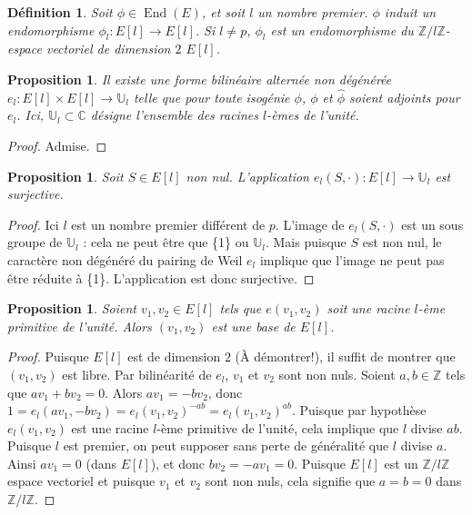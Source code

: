 \documentclass{article}
\theoremstyle{plain}%
\newtheorem{prop}[thm]{Proposition}
\newtheorem{deff}[thm]{Définition}
\theoremstyle{definition}%
\newcommand{\Z}{\mathbb{Z}}
\newcommand{\U}{\mathbb{U}}
\newcommand{\h}{\widehat}
\DeclareMathOperator{\End}{End}
\begin{document}
\begin{deff}
  Soit $\phi\in \End(E)$, et soit $l$ un nombre premier. $\phi$ induit un endomorphisme $\phi_l : E[l] \to E[l]$. Si $l\neq p$, $\phi_l$ est un endomorphisme du $\Z/l\Z$-espace vectoriel de dimension $2$ $E[l]$. 
\end{deff}

\begin{prop}
  \label{pairing}
  Il existe une forme bilinéaire alternée non dégénérée 
  $e_l : E[l] \times E[l] \to \mathbb{U}_l$ telle que pour toute isogénie $\phi$, $\phi$ et $\h\phi$ soient adjoints pour $e_l$.
  Ici, $\mathbb{U}_l \subset \mathbb{C}$ 
  désigne l'ensemble des racines $l$-èmes de l'unité.
\end{prop}

\begin{proof}
  Admise.
\end{proof}

\begin{prop}
  \label{surj_el}
  Soit $S\in E[l]$ non nul. L'application $e_l(S,\cdot):E[l] \to \mathbb{U}_l$ est surjective.
\end{prop}

\begin{proof}
  Ici $l$ est un nombre premier différent de $p$. L'image de  $e_l(S,\cdot)$ est un sous groupe de $\mathbb{U}_l$ : cela ne peut être que \{1\} ou $\U_l$. Mais puisque $S$ est non nul, le caractère non dégénéré du pairing de Weil $e_l$ implique que l'image ne peut pas être réduite à \{1\}. L'application est donc surjective.
\end{proof}

\begin{prop}
  \label{pairing_base}
  Soient $v_1, v_2\in E[l]$ tels que $e(v_1, v_2)$ soit une racine $l$-ème primitive de l'unité. Alors $(v_1, v_2)$ est une base de $E[l]$. 
\end{prop}

\begin{proof}
  Puisque $E[l]$ est de dimension $2$ {\color{red} (À démontrer!)}, il suffit de montrer que $(v_1, v_2)$ est libre. Par bilinéarité de $e_l$, $v_1$ et $v_2$ sont non nuls. Soient $a, b\in\Z$ tels que $av_1 + bv_2 = 0$. Alors $av_1 = -bv_2$, donc $1 = e_l(av_1, -bv_2) = e_l(v_1, v_2)^{-ab} = e_l(v_1, v_2)^{ab}$. Puisque par hypothèse $e_l(v_1, v_2)$ est une racine $l$-ème primitive de l'unité, cela implique que $l$ divise $ab$. Puisque $l$ est premier, on peut supposer sans perte de généralité que $l$ divise $a$. Ainsi $av_1 = 0$ (dans $E[l]$), et donc $bv_2=-av_1=0$. Puisque $E[l]$ est un $\Z/l\Z$ espace vectoriel et puisque $v_1$ et $v_2$ sont non nuls, cela signifie que $a=b=0$ dans $\Z/l\Z$.
\end{proof}
\end{document}
